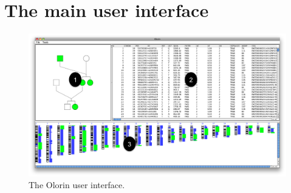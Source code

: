 \documentclass{article}
\begin{document}
\section{The main user interface}
\begin{figure}[H]
	\centering
		\includegraphics[scale=0.5]{olorin_main}
	\caption{The Olorin user interface.}
	\label{main}
\end{figure}
\end{document}
